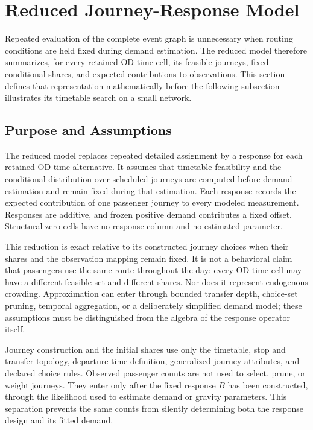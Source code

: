 
\section{Reduced Journey-Response Model}

Repeated evaluation of the complete event graph is unnecessary when routing
conditions are held fixed during demand estimation. The reduced model therefore
summarizes, for every retained OD-time cell, its feasible journeys, fixed
conditional shares, and expected contributions to observations. This section
defines that representation mathematically before the following subsection
illustrates its timetable search on a small network.

\subsection{Purpose and Assumptions}

The reduced model replaces repeated detailed assignment by a response for each
retained OD-time alternative.  It assumes that timetable feasibility and the
conditional distribution over scheduled journeys are computed before demand
estimation and remain fixed during that estimation.  Each response records the
expected contribution of one passenger journey to every modeled measurement.
Responses are additive, and frozen positive demand contributes a fixed offset.
Structural-zero cells have no response column and no estimated parameter.

This reduction is exact relative to its constructed journey choices when their
shares and the observation mapping remain fixed.  It is not a behavioral claim
that passengers use the same route throughout the day: every OD-time cell may
have a different feasible set and different shares.  Nor does it represent
endogenous crowding.  Approximation can enter through bounded transfer depth,
choice-set pruning, temporal aggregation, or a deliberately simplified demand
model; these assumptions must be distinguished from the algebra of the
response operator itself.

Journey construction and the initial shares use only the timetable, stop and
transfer topology, departure-time definition, generalized journey attributes,
and declared choice rules. Observed passenger counts are not used to select,
prune, or weight journeys. They enter only after the fixed response $B$ has
been constructed, through the likelihood used to estimate demand or gravity
parameters. This separation prevents the same counts from silently determining
both the response design and its fitted demand.


